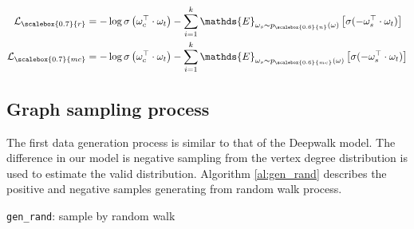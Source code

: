 \documentclass{sig-alternate-05-2015}
\begin{document}
\begin{equation} \label{eq:loss_each}
  \begin{aligned}
    \mathcal{L}_{\scalebox{0.7}{r}} & = -\log \sigma \left(\omega^\top_c \cdot \omega_t\right) - 
      \sum^{k}_{i=1} \mathds{E}_{\omega_s \sim p_{\scalebox{0.6}{n}}(\omega)} \left[\sigma (-\omega^\top_s \cdot \omega_t)\right] \\
    \mathcal{L}_{\scalebox{0.7}{mc}} & = -\log \sigma \left(\omega^\top_c \cdot \omega_t\right) -
      \sum^{k}_{i=1} \mathds{E}_{\omega_s \sim p_{\scalebox{0.6}{mc}}(\omega)} \left[\sigma (-\omega^\top_s \cdot \omega_t)\right] \\
  \end{aligned}
\end{equation}

\subsection{Graph sampling process}

The first data generation process is similar to that of
the Deepwalk model. The difference in our model is negative
sampling from the vertex degree distribution is used to
estimate the valid distribution. Algorithm \ref{al:gen_rand}
describes the positive and negative samples generating 
from random walk process.

\begin{algorithm}[h] \label{al:gen_rand}
\caption{\texttt{gen\_rand}: sample by random walk}
\end{algorithm}
\end{document}
